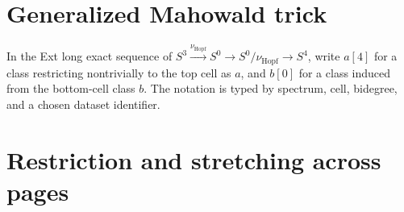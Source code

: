 \section{Generalized Mahowald trick}













\begin{definition}
  \label{def:hopf-cofiber-cell-notation}
  \notready
  In the Ext long exact sequence of
  $S^3\xrightarrow{\nu_{\mathrm{Hopf}}}S^0\to S^0/\nu_{\mathrm{Hopf}}\to S^4$, write
  $a[4]$ for a class restricting nontrivially to the top cell as $a$, and
  $b[0]$ for a class induced from the bottom-cell class $b$.  The notation is
  typed by spectrum, cell, bidegree, and a chosen dataset identifier.
\end{definition}



\section{Restriction and stretching across pages}











